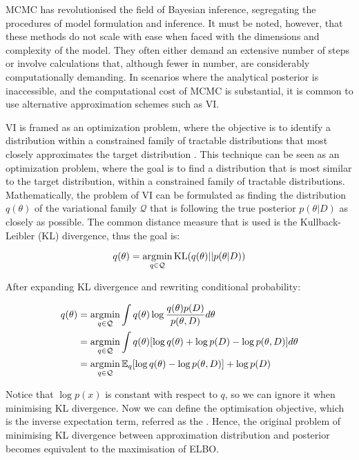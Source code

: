 \ac{MCMC} has revolutionised the field of Bayesian inference, segregating the procedures of model formulation and inference. It must be noted, however, that these methods do not scale with ease when faced with the dimensions and complexity of the model. They often either demand an extensive number of steps or involve calculations that, although fewer in number, are considerably computationally demanding. In scenarios where the analytical posterior is inaccessible, and the computational cost of \ac{MCMC} is substantial, it is common to use alternative approximation schemes such as \ac{VI}.

\acl{VI} is framed as an optimization problem, where the objective is to identify a distribution within a constrained family of tractable distributions that most closely approximates the target distribution \parencite{Blei2017-dm}. This technique can be seen as an optimization problem, where the goal is to find a distribution that is most similar to the target distribution, within a constrained family of tractable distributions. Mathematically, the problem of \acl{VI} can be formulated as finding the distribution $q(\theta)$ of the variational family $\mathcal{Q}$ that is following the true posterior $p(\theta | D)$ as closely as possible. The common distance measure that is used is the Kullback-Leibler (KL) divergence, thus the goal is:

\begin{equation}
q(\theta) = \operatorname*{\arg\!\min}_{q \in \mathcal{Q}} \text{KL}(q(\theta) || p(\theta | D))  
\end{equation}

After expanding KL divergence and rewriting conditional probability:

\begin{align}
q(\theta) &= \operatorname*{\arg\!\min}_{q \in \mathcal{Q}} \int q(\theta) \log \frac{q(\theta) p(D)}{p(\theta, D)} d\theta \\
&= \operatorname*{\arg\!\min}_{q \in \mathcal{Q}} \int q(\theta) [\log q(\theta) + \log p(D) - \log p(\theta, D)] d\theta \\
&= \operatorname*{\arg\!\min}_{q \in \mathcal{Q}} \mathbb{E}_q [\log q(\theta) -  \log p(\theta, D)] + \log p(D)
\end{align}

Notice that $\log p(x)$ is constant with respect to $q$, so we can ignore it when minimising KL divergence. Now we can define the optimisation objective, which is the inverse expectation term, referred as the . Hence, the original problem of minimising KL divergence between approximation distribution and posterior becomes equivalent to the maximisation of \ac{ELBO}. 

